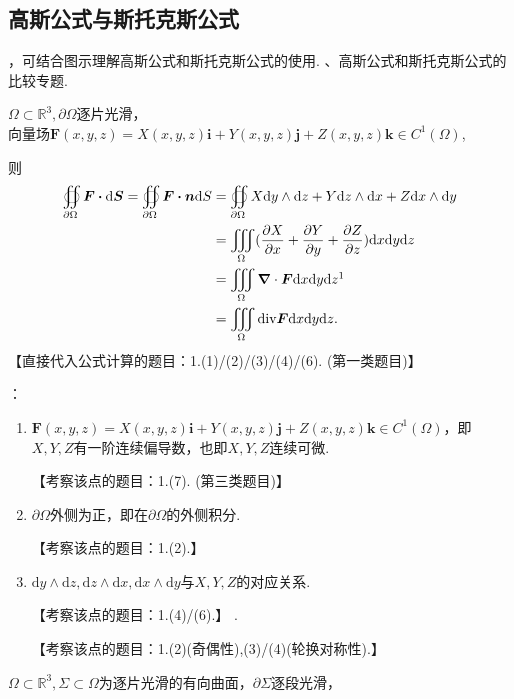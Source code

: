 \documentclass[12pt,UTF8,fleqn]{ctexart}
\newcommand{\varIIInt}[5]{\iiint\limits_{#1}#2\mathrm d#3\mathrm d#4\mathrm d#5}
\newcommand{\md}[1]{\mathrm d#1}
\newcommand{\pp}[2]{\frac{\partial #1}{\partial #2}}
\newcommand{\BSOIInt}[2]{\oiint\limits_{#1}#2}
\begin{document}
\subsection{高斯公式与斯托克斯公式}
\begin{enumerate}
，可结合图示理解高斯公式和斯托克斯公式的使用.
、高斯公式和斯托克斯公式的比较专题.

$\Omega\subset\mathbb R^3,\partial\Omega$逐片光滑，\\
向量场$\bm F(x,y,z)=X(x,y,z)\bm i+Y(x,y,z)\bm j+Z(x,y,z)\bm k\in C^1(\Omega)$,

则
\[\begin{aligned}
\BSOIInt{\partial\Omega}{\bm F\bm\cdot\md\bm S}=\BSOIInt{\partial\Omega}{\bm F\bm\cdot\bm n\md S}&=\BSOIInt{\partial\Omega}{X\md y\wedge\md z+Y\md z\wedge\md x+Z\md x\wedge\md y}\\
&=\varIIInt\Omega{(\pp Xx+\pp Yy+\pp Zz)}xyz\\
&=\varIIInt\Omega{\bm\nabla\cdot\bm F}xyz\footnotemark\\
&=\varIIInt\Omega{\text{div}\bm F}xyz.
\end{aligned}\]
【直接代入公式计算的题目：1.(1)/(2)/(3)/(4)/(6). (第一类题目)】

{：}
\begin{enumerate}
，可添加简单曲面构造封闭区域，利用高斯公式计算.

【利用该点计算的题目：1.(5). (第二类题目)】

\item$\bm F(x,y,z)=X(x,y,z)\bm i+Y(x,y,z)\bm j+Z(x,y,z)\bm k\in C^1(\Omega)$，即$X,Y,Z$有一阶连续偏导数，也即$X,Y,Z$连续可微.

【考察该点的题目：1.(7). (第三类题目)】
\item$\partial\Omega$外侧为正，即在$\partial\Omega$的外侧积分.

【考察该点的题目：1.(2).】

\item$\md y\wedge\md z,\md z\wedge\md x,\md x\wedge\md y$与$X,Y,Z$的对应关系.

【考察该点的题目：1.(4)/(6).】
.

【考察该点的题目：1.(2)(奇偶性),(3)/(4)(轮换对称性).】
\end{enumerate}

$\Omega\subset\mathbb R^3,\Sigma\subset\Omega$为逐片光滑的有向曲面，$\partial\Sigma$逐段光滑，


\end{enumerate}
\end{document}
